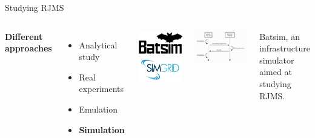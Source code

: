 \documentclass[12pt, aspectratio=43]{beamer}
\begin{document}
\begin{frame}{Studying RJMS}
	\begin{columns}
		\textbf{Different approaches}
		\begin{itemize}
			\item Analytical study
			\item Real experiments
			\item Emulation
			\item \textbf{Simulation}
		\end{itemize}

		\centering
		\includegraphics[scale=0.3]{../imgs/batsim-logo.png}
		\includegraphics[scale=0.3]{../imgs/simgrid-logo.png}

		\vspace{4ex}

		\includegraphics[scale=0.3]{../imgs/batsim-sequence-diag.png}

		\small{Batsim, an infrastructure simulator aimed at studying RJMS.}
	\end{columns}
\end{frame}
\end{document}
